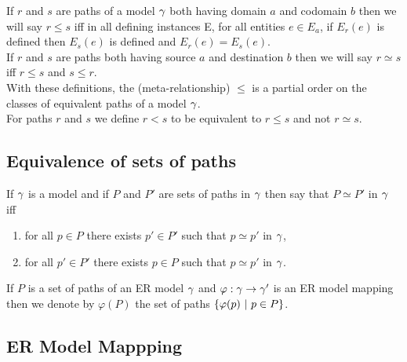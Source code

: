 \noindent If $r$ and $s$ are paths of a model $\gamma$ both having domain $a$ and codomain $b$ then we will say $r \leq s$ iff in all defining instances E, for all entities $e \in E_a$, if $E_r(e)$ is defined then $E_s(e)$ is defined and $E_r(e)=E_s(e)$. \\

\noindent If $r$ and $s$ are paths both having source $a$ and destination $b$ then we will say $r \simeq s$ iff $r \leq s$ and $s \leq r$. \\

\noindent With these definitions,  the (meta-relationship) $\leq$ is a partial order on the classes of equivalent paths of a model $\gamma$. \\

\noindent For paths $r$ and $s$ we define $r < s$ to be equivalent to $r \leq s$ and not $r \simeq s$. \\

\subsection{Equivalence of sets of paths}
\begin{definition}
If $\gamma$ is a model and if $P$ and $P'$ are sets of paths in $\gamma$ then say that
$P \simeq P'$ in $\gamma$ iff
\begin{enumerate}
\item for all $p \in P$ there exists $p' \in P'$ such that $p \simeq p'$ in $\gamma$,
\item for all $p' \in P'$ there exists $p \in P$ such that $p \simeq p'$ in $\gamma$.
\end{enumerate} 
\end{definition}

If $P$ is a set of paths of an ER model $\gamma$ and $\varphi : \gamma \rightarrow \gamma'$ is an ER model mapping then we denote by $\varphi(P)$ the set of paths
$\left\{\varphi(p) \ \middle|\ p \in P\right\}$.

\subsection{ER Model Mappping}

